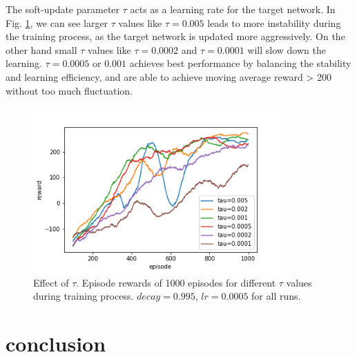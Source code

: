 \documentclass[conference]{IEEEtran}
\begin{document}
The soft-update parameter $\tau$ acts as a learning rate for the target network. In Fig. \ref{fig:tau}, we can see larger $\tau$ values like $\tau=0.005$ leads to more instability during the training process, as the target network is updated more aggressively. On the other hand small $\tau$ values like $\tau=0.0002$ and $\tau=0.0001$ will slow down the learning. $\tau=0.0005$ or $0.001$ achieves best performance by balancing the stability and learning efficiency, and are able to achieve moving average reward > 200 without too much fluctuation.

\begin{figure}
	\includegraphics[height=2.5in]{figures/tau.png} 
	\caption{Effect of $\tau$. Episode rewards of 1000 episodes for different $\tau$ values during training process. $decay=0.995$, $lr=0.0005$ for all runs.}
	\label{fig:tau}
\end{figure}
	
\section{conclusion}


	


\end{document}
